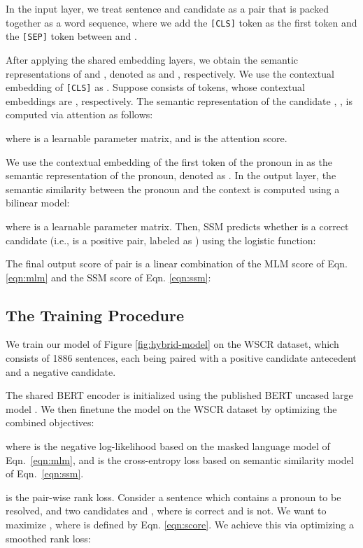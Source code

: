 \documentclass[11pt,a4paper]{article}
\begin{document}
In the input layer, we treat sentence  and candidate  as a pair  that is packed together as a word sequence, where we add the \texttt{[CLS]} token as the first token and the \texttt{[SEP]} token between  and .

After applying the shared embedding layers, we obtain the semantic representations of  and , denoted as  and , respectively. We use the contextual embedding of \texttt{[CLS]} as . Suppose  consists of  tokens, whose contextual embeddings are , respectively. The semantic representation of the candidate , , is computed via attention as follows:


where  is a learnable parameter matrix, and  is the attention score. 

We use the contextual embedding of the first token of the pronoun in  as the semantic representation of the pronoun, denoted as . 
In the output layer, the semantic similarity between the pronoun and the context is computed using a bilinear model:

where  is a learnable parameter matrix.
Then, SSM predicts whether  is a correct candidate (i.e.,  is a positive pair, labeled as ) using the logistic function:


The final output score of pair  is a linear combination of the MLM score of Eqn. \ref{eqn:mlm} and the SSM score of Eqn. \ref{eqn:ssm}:

\subsection{The Training Procedure}

We train our model of Figure \ref{fig:hybrid-model} on the WSCR dataset, which consists of 1886 sentences, each being paired with a positive candidate antecedent and a negative candidate. 

The shared BERT encoder is initialized using the published BERT uncased large model \cite{devlin2018bert}. We then finetune the model on the WSCR dataset by optimizing the combined objectives:

where  is the negative log-likelihood based on the masked language model of Eqn.~\ref{eqn:mlm}, and  is the cross-entropy loss based on semantic similarity model of Eqn.~\ref{eqn:ssm}. 

 is the pair-wise rank loss. 
Consider a sentence  which contains a pronoun to be resolved, and two candidates  and , where  is correct and  is not. We want to maximize , where  is defined by Eqn. \ref{eqn:score}. We achieve this via optimizing a smoothed rank loss:
\end{document}
